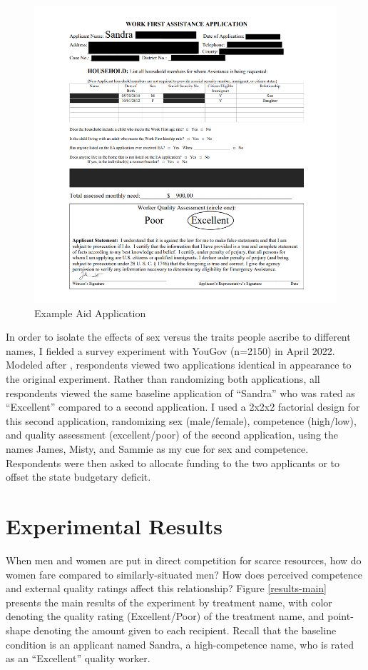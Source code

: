 \documentclass[12pt]{article}%
\begin{document}
\begin{doublespace}
\begin{figure}[h!]
	\centering
	\includegraphics[scale=1]{figs/example_treatment.png}
	\caption{Example Aid Application}
	\label{figure2}
\end{figure}


In order to isolate the effects of sex versus the traits people ascribe to different names, I fielded a survey experiment with YouGov (n=2150) in April 2022. Modeled after \cite{desante_working_2013}, respondents viewed two applications identical in appearance to the original experiment. Rather than randomizing both applications, all respondents viewed the same baseline application of ``Sandra” who was rated as ``Excellent” compared to a second application. I used a 2x2x2 factorial design for this second application, randomizing sex (male/female), competence (high/low), and quality assessment (excellent/poor) of the second application, using the names James, Misty, and Sammie as my cue for sex and competence. Respondents were then asked to allocate funding to the two applicants or to offset the state budgetary deficit.

\section*{Experimental Results}
When men and women are put in direct competition for scarce resources, how do women fare compared to similarly-situated men? How does perceived competence and external quality ratings affect this relationship? Figure \ref{results-main} presents the main results of the experiment by treatment name, with color denoting the quality rating (Excellent/Poor) of the treatment name, and point-shape denoting the amount given to each recipient. Recall that the baseline condition is an applicant named Sandra, a high-competence name, who is rated as an ``Excellent” quality worker.


\end{doublespace}
\end{document}
